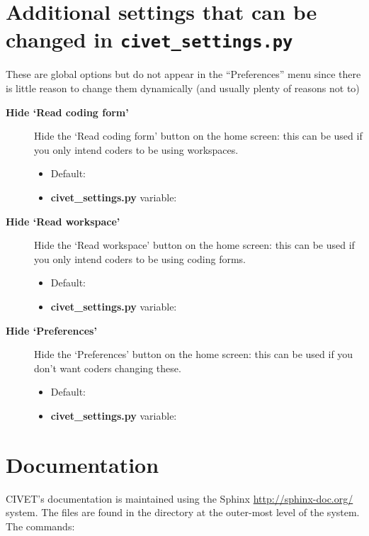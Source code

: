 \documentclass[letterpaper,10pt,english]{sphinxmanual}
\begin{document}
\section{Additional settings that can be changed in \texttt{civet\_settings.py}}
\label{appendix3:additional-settings-that-can-be-changed-in-civet-settings-py}
These are global options but do not appear in the “Preferences” menu since there
is little reason to change them dynamically (and usually plenty of reasons not to)
\begin{description}
\item[{\textbf{Hide ‘Read coding form’}}] \leavevmode
Hide the ‘Read coding form’ button on the home screen: this can be used if you
only intend coders to be using workspaces.
\begin{itemize}
\item {} 
Default: 

\item {} 
\textbf{civet\_settings.py} variable: 

\end{itemize}

\item[{\textbf{Hide ‘Read workspace’}}] \leavevmode
Hide the ‘Read workspace’ button on the home screen: this can be used if you
only intend coders to be using coding forms.
\begin{itemize}
\item {} 
Default: 

\item {} 
\textbf{civet\_settings.py} variable: 

\end{itemize}

\item[{\textbf{Hide ‘Preferences’}}] \leavevmode
Hide the ‘Preferences’ button on the home screen: this can be used if you
don't want coders changing these.
\begin{itemize}
\item {} 
Default: 

\item {} 
\textbf{civet\_settings.py} variable: 

\end{itemize}

\end{description}


\section{Documentation}
\label{appendix3:documentation}
CIVET's documentation is maintained using the Sphinx \href{http://sphinx-doc.org/}{http://sphinx-doc.org/} system.
The files are found in the  directory at the outer-most level of the system.
The commands:
\end{document}
